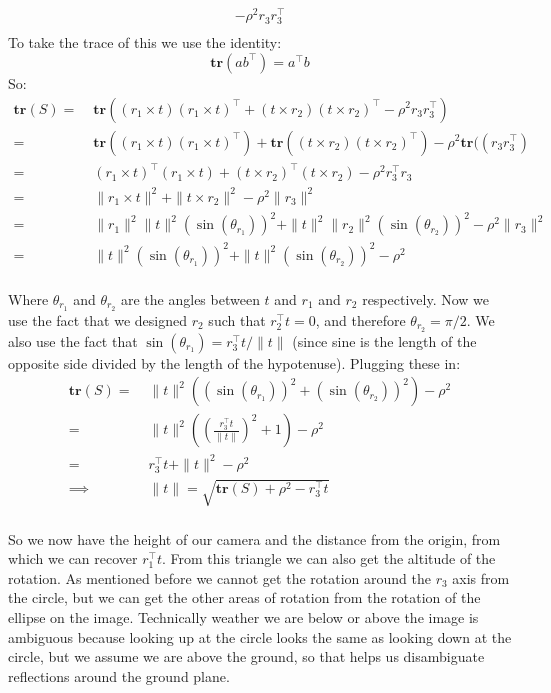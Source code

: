 \documentclass[11pt,english]{article}
\begin{document}
\begin{enumerate}
\begin{align*}
		- \rho^2 r_3 r_3^\top \\
\end{align*}
To take the trace of this we use the identity:
\[ \mathbf{tr}(ab^\top) = a^\top b \]
So:
\begin{align*}
\mathbf{tr}(S) 
=&\; \mathbf{tr}((r_1 \times t)(r_1 \times t)^\top + (t \times r_2)(t \times r_2)^\top
		- \rho^2 r_3 r_3^\top) \\
=&\; \mathbf{tr}((r_1 \times t)(r_1 \times t)^\top) + \mathbf{tr}((t \times r_2)(t \times r_2)^\top)
		- \rho^2 \mathbf{tr}((r_3 r_3^\top) \\
=&\; (r_1 \times t)^\top (r_1 \times t) + (t \times r_2)^\top (t \times r_2) - \rho^2 r_3^\top r_3 \\
=&\; \|r_1 \times t\|^2 + \| t \times r_2 \|^2 - \rho^2 \| r_3 \|^2 \\
=&\; \|r_1\|^2 \|t\|^2 (\sin(\theta_{r_1}))^2 + \|t\|^2 \|r_2\|^2 (\sin(\theta_{r_2}))^2 - \rho^2 \| r_3 \|^2 \\
=&\; \|t\|^2 (\sin(\theta_{r_1}))^2 + \|t\|^2 (\sin(\theta_{r_2}))^2 - \rho^2 \\
\end{align*}

Where $\theta_{r_1}$ and $\theta_{r_2}$ are the angles between $t$ and $r_1$ and $r_2$ respectively.
Now we use the fact that we designed $r_2$ such that $r_2^\top t = 0$, and therefore $\theta_{r_2} = \pi/2$.
We also use the fact that $\sin(\theta_{r_1}) = r_3^\top t / \|t\|$ (since sine is the length of the opposite side
divided by the length of the hypotenuse). Plugging these in:
\begin{align*}
\mathbf{tr}(S) 
=&\; \|t\|^2 ((\sin(\theta_{r_1}))^2 + (\sin(\theta_{r_2}))^2) - \rho^2 \\
=&\; \|t\|^2 \left(\left(\frac{r_3^\top t}{\|t\|}\right)^2 + 1\right) - \rho^2 \\
=&\; r_3^\top t + \|t\|^2 - \rho^2 \\
\implies &\; \|t\| = \sqrt{\mathbf{tr}(S) + \rho^2 - r_3^\top t} \\
\end{align*}

So we now have the height of our camera and the distance from the origin, from which we can recover
$r_1^\top t$. From this triangle we can also get the altitude of the rotation. As mentioned before we
cannot get the rotation around the $r_3$ axis from the circle, but we can get the other areas of rotation
from the rotation of the ellipse on the image. Technically weather we are below or above the image is ambiguous
because looking up at the circle looks the same as looking down at the circle, but we assume we are above the
ground, so that helps us disambiguate reflections around the ground plane.


\end{enumerate}
\end{document}
